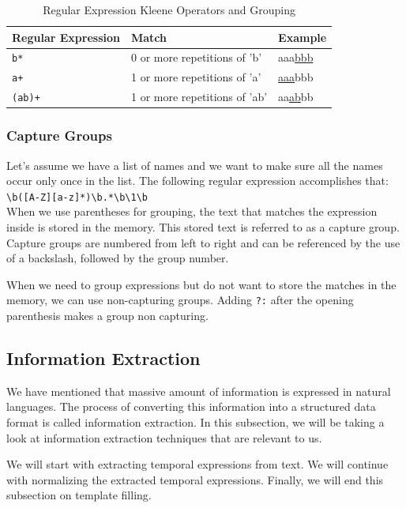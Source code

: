 \begin{table}[htbp]
  \caption[Regular Expression Kleene Operators and Grouping]{Regular Expression Kleene Operators and Grouping}\label{tab:re_kog}
  \centering
  \begin{tabular}{l l l}
    Regular Expression&Match&Example\\ \toprule
    \texttt{b*}&0 or more repetitions of 'b'&aaa\underline{bbb}\\ \hline
    \texttt{a+}&1 or more repetitions of 'a'&\underline{aaa}bbb\\ \hline
    \texttt{(ab)+}&1 or more repetitions of 'ab'&aa\underline{ab}bb\\ \hline
  \end{tabular}
\end{table}

\subsubsection{Capture Groups}

Let's assume we have a list of names and we want to make sure all the names occur only once in the list. 
The following regular expression accomplishes that:\\
\texttt{\textbackslash b([A-Z][a-z]*)\textbackslash b.*\textbackslash b\textbackslash1\textbackslash b}\\
When we use parentheses for grouping, the text that matches the expression inside is stored in the memory.
This stored text is referred to as a capture group.
Capture groups are numbered from left to right and can be referenced by the use of a backslash, followed by the group number. 

When we need to group expressions but do not want to store the matches in the memory, we can use non-capturing groups.
Adding \texttt{?:} after the opening parenthesis makes a group non capturing.

\subsection{Information Extraction}
We have mentioned that massive amount of information is expressed in natural languages.
The process of converting this information into a structured data format is called information extraction.
In this subsection, we will be taking a look at information extraction techniques that are relevant to us.

We will start with extracting temporal expressions from text. 
We will continue with normalizing the extracted temporal expressions.
Finally, we will end this subsection on template filling.

